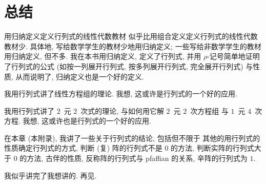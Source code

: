 \documentclass[../libro]{subfiles}
\begin{document}

\section{总结}

用归纳定义定义行列式的线性代数教材%
似乎比用组合定义定义行列式的线性代数教材少.
具体地, 写给数学学生的教材少地用归纳定义;
一些写给非数学学生的教材用归纳定义,
但不多.
我在本书用归纳定义,
定义了行列式,
并用 \(\rho\)-记号简单地证明了行列式的公式
(如按一列展开行列式,
按多列展开行列式,
完全展开行列式)
与性质,
从而说明了,
归纳定义也是一个好的定义.

我用行列式讲了线性方程组的理论.
我想, 这或许是行列式的一个好的应用.

我用行列式讲了 \(2\)~元 \(2\)~次式的理论,
与如何用它解 \(2\)~元 \(2\)~次方程组%
与 \(1\)~元 \(4\)~次方程.
我想, 这或许也是行列式的一个好的应用.

在本章 (本附录), 我讲了一些关于行列式的结论,
包括但不限于%
其他的用行列式的性质确定行列式的方式,
判断 (复) 阵的行列式不是 \(0\) 的方法,
判断实阵的行列式大于 \(0\) 的方法,
古伴的性质,
反称阵的行列式与 pfaffian 的关系,
辛阵的行列式为 \(1\).

我似乎讲完了我想讲的.
再见.

\end{document}
